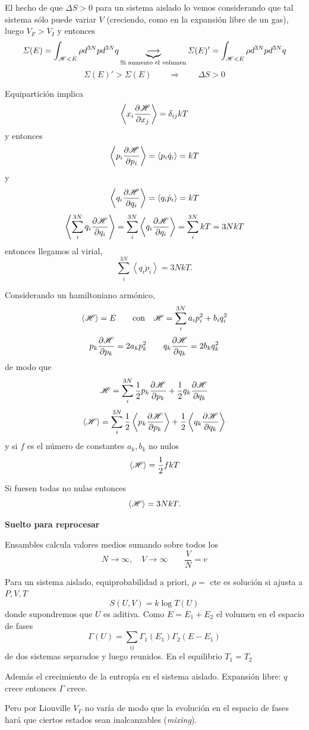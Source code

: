 \documentclass[10pt,oneside]{CBFT_book}
\begin{document}
El hecho de que $\Delta S> 0$ para un sistema aislado lo vemos considerando que tal sistema sólo puede variar
$V$ (creciendo, como en la expansión libre de un gas), luego $V_F > V_I$ y entonces
\[
	\Sigma(E) = \int_{\mathscr{H} < E} \rho d^{3N}p d^{3N}q \underbrace{\longrightarrow}_{\text{Si aumento el volumen}}
	\Sigma(E)' = \int_{\mathscr{H} < E} \rho d^{3N}p d^{3N}q
\]
\[
	\Sigma(E)' > \Sigma(E) \qquad \Rightarrow \qquad \Delta S > 0
\]

Equipartición implica 
\[
	\left< x_i \frac{\partial^{\hspace{-0.05em}} {\mathscr{H}}}{\partial {x_j}^{\hspace{-0.05em}}} \right> = \delta_{ij} k T
\]
y entonces
\[
	\left< p_i \frac{\partial^{\hspace{-0.05em}} {\mathscr{H}}}{\partial {p_i}^{\hspace{-0.05em}}} \right> = \left< p_i \dot{q}_i \right> = kT 
\]
y
\[
	\left< q_i \frac{\partial^{\hspace{-0.05em}} {\mathscr{H}}}{\partial {q_i}^{\hspace{-0.05em}}} \right> = \left< q_i \dot{p}_i \right> = kT 
\]
\[
	\left< \sum_i^{3N} q_i \frac{\partial^{\hspace{-0.05em}} {\mathscr{H}}}{\partial {q_i}^{\hspace{-0.05em}}} \right> =  \sum_i^{3N} \left< q_i \frac{\partial^{\hspace{-0.05em}} {\mathscr{H}}}{\partial {q_i}^{\hspace{-0.05em}}} \right> =
	\sum_i^{3N} k T = 3 N k T
\]
entonces llegamos al virial,
\[
	\sum_i^{3N} \left< q_i \dot{p}_i \right> = 3 N k T.
\]

Considerando un hamiltoniano armónico,
\[
	\left< \mathscr{H} \right> = E \qquad \text{con} \quad \mathscr{H} = \sum_i^{3N} a_i p_i^2 + b_i q_i^2
\]
\[
	p_k \frac{\partial^{\hspace{-0.05em}} {\mathscr{H}}}{\partial {p_k}^{\hspace{-0.05em}}} = 2 a_k p_k^2 \qquad q_k \frac{\partial^{\hspace{-0.05em}} {\mathscr{H}}}{\partial {q_k}^{\hspace{-0.05em}}} = 2 b_k q_k^2
\]
de modo que 
\[
	\mathscr{H} =  \sum_i^{3N} \frac{1}{2} p_k \frac{\partial^{\hspace{-0.05em}} {\mathscr{H}}}{\partial {p_k}^{\hspace{-0.05em}}} + \frac{1}{2} q_k \frac{\partial^{\hspace{-0.05em}} {\mathscr{H}}}{\partial {q_k}^{\hspace{-0.05em}}}
\]
\[
	\left< \mathscr{H} \right> =  \sum_i^{3N} \frac{1}{2} \left< p_k \frac{\partial^{\hspace{-0.05em}} {\mathscr{H}}}{\partial {p_k}^{\hspace{-0.05em}}}\right> +
		\frac{1}{2} \left< q_k \frac{\partial^{\hspace{-0.05em}} {\mathscr{H}}}{\partial {q_k}^{\hspace{-0.05em}}} \right>
\]
y si $f$ es el número de constantes $a_k,b_k$ no nulos
\[
	\left< \mathscr{H} \right> =  \frac{1}{2} f k T
\]

Si fuesen todas no nulas entonces
\[
	\left< \mathscr{H} \right>  = 3 N k T.
\]

{\bf Suelto para reprocesar}

Ensambles calcula valores medios sumando sobre todos los
\[
	N \to  \infty, \quad V \to \infty \qquad \frac V N = v
\]

Para un sistema aislado, equiprobabilidad a priori, $\rho=$ cte es solución si ajusta a $P,V,T$
\[
	S(U,V) = k \log T(U)
\]
donde supondremos que $U$ es aditiva. Como $E=E_1 + E_2$ el volumen en el espacio de fases
\[
	\Gamma(U) = \sum_{i j} \Gamma_1(E_1)\Gamma_2(E - E_1)
\]
de dos sistemas separados y luego reunidos.
En el equilibrio $T_1=T_2$

Además el crecimiento de la entropía en el sistema aislado. Expansión libre: $q$ crece entonces 
$\Gamma$ crece.

Pero por Liouville $V_\Gamma$ no varía de modo que la evolución en el espacio de fases hará que
ciertos estados sean inalcanzables ({\it mixing}).
\end{document}
